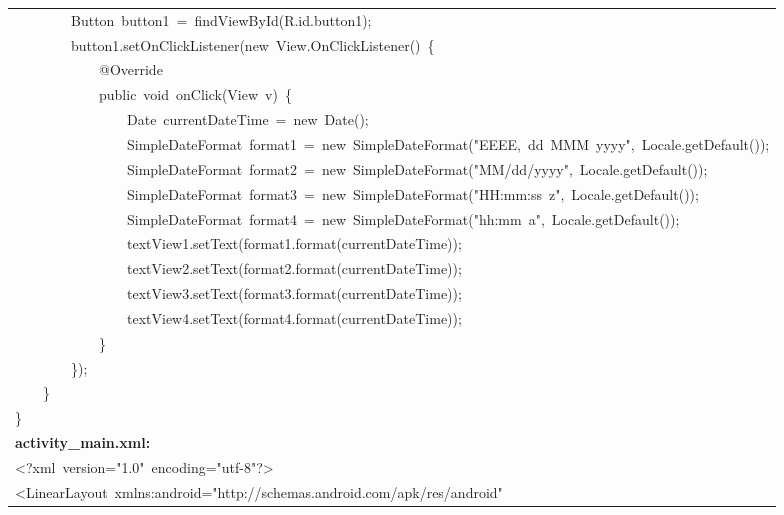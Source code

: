 \documentclass[a4paper,12pt]{article}
\begin{document}
\begin{longtable}{|p{}|}
{\ttfamily\small \ \ \ \ \ \ \ \ Button\ button1\ =\ findViewById(R.id.button1);} \\
{\ttfamily\small \ \ \ \ \ \ \ \ button1.setOnClickListener(new\ View.OnClickListener()\ \{} \\
{\ttfamily\small \ \ \ \ \ \ \ \ \ \ \ \ @Override} \\
{\ttfamily\small \ \ \ \ \ \ \ \ \ \ \ \ public\ void\ onClick(View\ v)\ \{} \\
{\ttfamily\small \ \ \ \ \ \ \ \ \ \ \ \ \ \ \ \ Date\ currentDateTime\ =\ new\ Date();} \\
{\ttfamily\small \ \ \ \ \ \ \ \ \ \ \ \ \ \ \ \ SimpleDateFormat\ format1\ =\ new\ SimpleDateFormat("EEEE,\ dd\ MMM\ yyyy",\ Locale.getDefault());} \\
{\ttfamily\small \ \ \ \ \ \ \ \ \ \ \ \ \ \ \ \ SimpleDateFormat\ format2\ =\ new\ SimpleDateFormat("MM/dd/yyyy",\ Locale.getDefault());} \\
{\ttfamily\small \ \ \ \ \ \ \ \ \ \ \ \ \ \ \ \ SimpleDateFormat\ format3\ =\ new\ SimpleDateFormat("HH:mm:ss\ z",\ Locale.getDefault());} \\
{\ttfamily\small \ \ \ \ \ \ \ \ \ \ \ \ \ \ \ \ SimpleDateFormat\ format4\ =\ new\ SimpleDateFormat("hh:mm\ a",\ Locale.getDefault());} \\
{\ttfamily\small \ \ \ \ \ \ \ \ \ \ \ \ \ \ \ \ textView1.setText(format1.format(currentDateTime));} \\
{\ttfamily\small \ \ \ \ \ \ \ \ \ \ \ \ \ \ \ \ textView2.setText(format2.format(currentDateTime));} \\
{\ttfamily\small \ \ \ \ \ \ \ \ \ \ \ \ \ \ \ \ textView3.setText(format3.format(currentDateTime));} \\
{\ttfamily\small \ \ \ \ \ \ \ \ \ \ \ \ \ \ \ \ textView4.setText(format4.format(currentDateTime));} \\
{\ttfamily\small \ \ \ \ \ \ \ \ \ \ \ \ \}} \\
{\ttfamily\small \ \ \ \ \ \ \ \ \});} \\
{\ttfamily\small \ \ \ \ \}} \\
{\ttfamily\small \}} \\
\hline
\rule{0pt}{13pt}\textbf{activity\_main.xml:} \\
\hline
{\ttfamily\small \textless{}?xml\ version="1.0"\ encoding="utf-8"?\textgreater{}} \\
{\ttfamily\small \textless{}LinearLayout\ xmlns:android="http://schemas.android.com/apk/res/android"} \\

\end{longtable}
\end{document}
